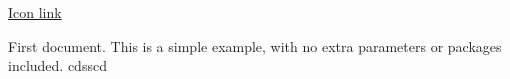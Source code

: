 \documentclass{article}
\begin{document}
\href{https://www.flaticon.com/free-icon/neural_2103658?related_id=2103633&origin=search#}{Icon link}

First document. This is a simple example, with no 
extra parameters or packages included.
cdsscd
\end{document}
